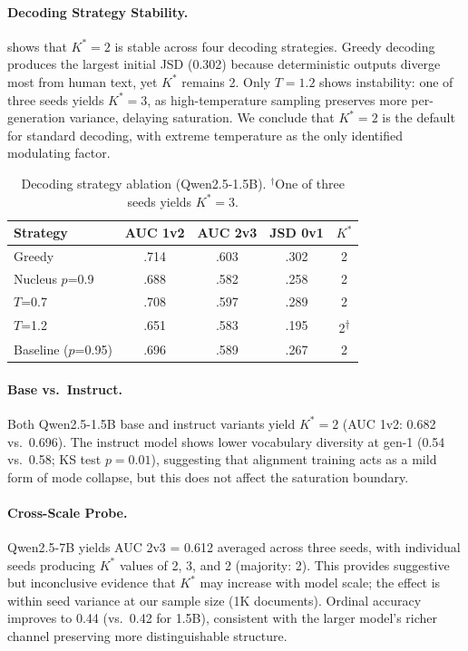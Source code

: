 \documentclass[11pt,a4paper]{article}
\begin{document}
\paragraph{Decoding Strategy Stability.}  shows that $K^*=2$ is stable across four decoding strategies. Greedy decoding produces the largest initial JSD (0.302) because deterministic outputs diverge most from human text, yet $K^*$ remains 2. Only $T=1.2$ shows instability: one of three seeds yields $K^*=3$, as high-temperature sampling preserves more per-generation variance, delaying saturation. We conclude that $K^*=2$ is the default for standard decoding, with extreme temperature as the only identified modulating factor.

\begin{table}[t]
\centering
\small
\begin{tabular}{lcccc}
\toprule
\textbf{Strategy} & \textbf{AUC 1v2} & \textbf{AUC 2v3} & \textbf{JSD 0v1} & $K^*$ \\
\midrule
Greedy & .714 & .603 & .302 & 2 \\
Nucleus $p$=0.9 & .688 & .582 & .258 & 2 \\
$T$=0.7 & .708 & .597 & .289 & 2 \\
$T$=1.2 & .651 & .583 & .195 & 2\textsuperscript{$\dagger$} \\
Baseline ($p$=0.95) & .696 & .589 & .267 & 2 \\
\bottomrule
\end{tabular}
\caption{Decoding strategy ablation (Qwen2.5-1.5B). $^\dagger$One of three seeds yields $K^*=3$.}
\label{tab:decoding}
\end{table}

\paragraph{Base vs.\ Instruct.} Both Qwen2.5-1.5B base and instruct variants yield $K^*=2$ (AUC 1v2: 0.682 vs.\ 0.696). The instruct model shows lower vocabulary diversity at gen-1 (0.54 vs.\ 0.58; KS test $p=0.01$), suggesting that alignment training acts as a mild form of mode collapse, but this does not affect the saturation boundary.

\paragraph{Cross-Scale Probe.} Qwen2.5-7B yields AUC 2v3 = 0.612 averaged across three seeds, with individual seeds producing $K^*$ values of 2, 3, and 2 (majority: 2). This provides suggestive but inconclusive evidence that $K^*$ may increase with model scale; the effect is within seed variance at our sample size (1K documents). Ordinal accuracy improves to 0.44 (vs.\ 0.42 for 1.5B), consistent with the larger model's richer channel preserving more distinguishable structure.
\end{document}
